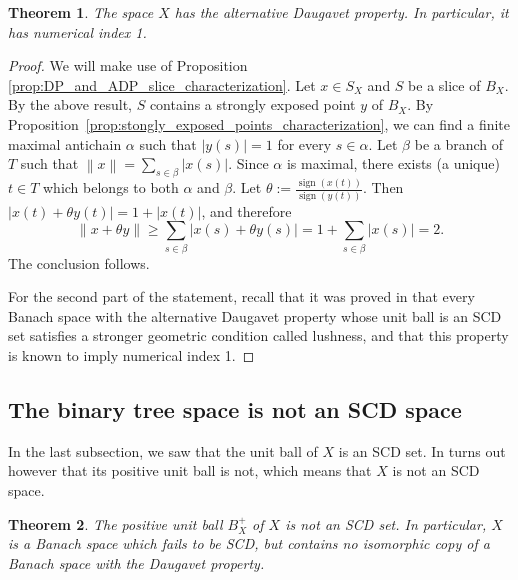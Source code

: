 \documentclass[11pt,a4paper,reqno]{amsart}
\numberwithin{equation}{section}
\newcommand{\abs}[1]{\left\lvert#1\right\rvert}
\newcommand{\norm}[1]{\left\lVert#1\right\rVert}
\DeclareMathOperator{\sign}{sign}
\newcommand{\1}{\mathbbm{1}}
\renewcommand{\geq}{\geqslant}
\theoremstyle{plain}
\newtheorem{theorem}{Theorem}[section]
\theoremstyle{definition}
\begin{document}
\begin{theorem}
    The space $X$ has the alternative Daugavet property. In particular, it has numerical index 1.
\end{theorem}

\begin{proof}
    We will make use of Proposition \ref{prop:DP_and_ADP_slice_characterization}. Let $x\in S_X$ and $S$ be a slice of $B_X$. By the above result, $S$ contains a strongly exposed point $y$ of $B_X$. By Proposition~\ref{prop:stongly_exposed_points_characterization}, we can find a finite maximal antichain $\alpha$ such that $\abs{y(s)}=1$ for every $s\in\alpha$. Let $\beta$ be a branch of $T$ such that $\norm{x}=\sum_{s\in\beta}\abs{x(s)}$. Since $\alpha$ is maximal, there exists (a unique) $t\in T$ which belongs to both $\alpha$ and $\beta$. Let $\theta:=\frac{\sign(x(t))}{\sign(y(t))}$. Then $\abs{x(t)+\theta y(t)}=1+\abs{x(t)}$, and therefore \begin{equation*}
        \norm{x+\theta y}\geq \sum_{s\in\beta}\abs{x(s)+\theta y(s)}= 1+\sum_{s\in\beta}\abs{x(s)}=2.
    \end{equation*}The conclusion follows. 

For the second part of the statement, recall that it was proved in \cite[Theorem~4.4]{AKMMS10} that every Banach space with the alternative Daugavet property whose unit ball is an SCD set satisfies a stronger geometric condition called lushness, and that this property is known to imply numerical index 1. 
\end{proof}




\subsection{The binary tree space is not an SCD space}\label{subsec:binary_tree_not_SCD} In the last subsection, we saw that the unit ball of $X$ is an SCD set. In turns out however that its positive unit ball is not, which means that $X$ is not an SCD space. 

\begin{theorem}\label{thm:binary_tree_space_is_not_SCD}
The positive unit ball $B_X^+$ of $X$ is not an SCD set. In particular, $X$ is a Banach space which fails to be SCD, but contains no isomorphic copy of a Banach space with the Daugavet property. 
\end{theorem}
\end{document}
